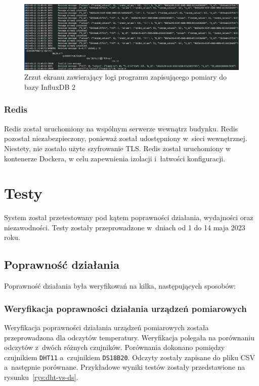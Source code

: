 \begin{figure}[b!]
    \begin{center}
        \includegraphics[width=13cm]{pic/logi-connector.png}
    \end{center}
    \caption{Zrzut ekranu zawierający logi programu zapisującego pomiary do bazy InfluxDB 2}\label{rys:logi-connector}
\end{figure}

\subsubsection{Redis}
Redis został uruchomiony na wspólnym serwerze wewnątrz budynku.
Redis pozostał niezabezpieczony, ponieważ został udostępniony w~sieci wewnętrznej.
Niestety, nie zostało użyte szyfrowanie TLS.
Redis został uruchomiony w kontenerze Dockera, w celu zapewnienia izolacji i~łatwości konfiguracji.

\section{Testy}
System został przetestowany pod kątem poprawności działania, wydajności oraz niezawodności.
Testy zostały przeprowadzone w~dniach od 1 do 14 maja 2023 roku.

\subsection{Poprawność działania}
Poprawność działania była weryfikowań na kilka, następujących sposobów:

\subsubsection{Weryfikacja poprawności działania urządzeń pomiarowych}

Weryfikacja poprawności działania urządzeń pomiarowych została przeprowadzona dla odczytów temperatury.
Weryfikacja polegała na porównaniu odczytów z~dwóch różnych czujników.
Porównania dokonano pomiędzy czujnikiem \texttt{DHT11} a~czujnikiem \texttt{DS18B20}.
Odczyty zostały zapisane do pliku CSV a~następnie porównane.
Przykładowe wyniki testów zostały przedstawione na rysunku~\ref{rys:dht-vs-ds}.

